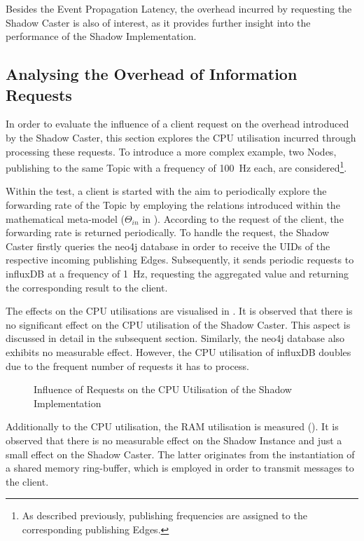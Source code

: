     Besides the Event Propagation Latency, the overhead incurred by requesting the Shadow Caster is also of interest, as it provides further insight into the performance of the Shadow Implementation.


    \subsection{Analysing the Overhead of Information Requests} \label{subsec:eval:requestAggregation}
        In order to evaluate the influence of a client request on the overhead introduced by the Shadow Caster, this section explores the CPU utilisation incurred through processing these requests.\newline
        To introduce a more complex example, two Nodes, publishing to the same Topic with a frequency of 100~Hz each, are considered\footnote{As described previously, publishing frequencies are assigned to the corresponding publishing Edges.}.

        Within the test, a client is started with the aim to periodically explore the forwarding rate of the Topic by employing the relations introduced within the mathematical meta-model ($\Theta_{in}$ in ). According to the request of the client, the forwarding rate is returned periodically. To handle the request, the Shadow Caster firstly queries the neo4j database in order to receive the UIDs of the respective incoming publishing Edges. Subsequently, it sends periodic requests to influxDB at a frequency of 1~Hz, requesting the aggregated value and returning the corresponding result to the client.

        The effects on the CPU utilisations are visualised in . It is observed that there is no significant effect on the CPU utilisation of the Shadow Caster. This aspect is discussed in detail in the subsequent section. Similarly, the neo4j database also exhibits no measurable effect. However, the CPU utilisation of influxDB doubles due to the frequent number of requests it has to process.
        \begin{figure}[h]
            \centering
            
            \caption{Influence of Requests on the CPU Utilisation of the Shadow Implementation} \label{fig:tikz:eval:aggregationOverhead}
        \end{figure}\newline
        Additionally to the CPU utilisation, the RAM utilisation is measured (). It is observed that there is no measurable effect on the Shadow Instance and just a small effect on the Shadow Caster. The latter originates from the instantiation of a shared memory ring-buffer, which is employed in order to transmit messages to the client.
       
